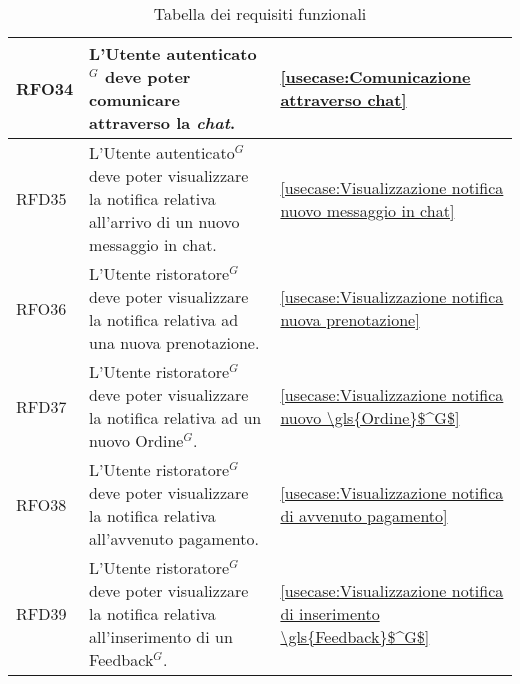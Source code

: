 \begin{table}[H]
\begin{tabularx}{\textwidth}{l|X|p{2cm}}
		\hline
		RFO34       & L'\gls{Utente autenticato}$^G$ deve poter comunicare attraverso la \textit{chat}.                                           & \autoref{usecase:Comunicazione attraverso chat}                                       \\
		\hline
		RFD35       & L'\gls{Utente autenticato}$^G$ deve poter visualizzare la notifica relativa all'arrivo di un nuovo messaggio in chat.       & \autoref{usecase:Visualizzazione notifica nuovo messaggio in chat}                    \\
		\hline
		RFO36       & L'\gls{Utente ristoratore}$^G$ deve poter visualizzare la notifica relativa ad una nuova prenotazione.                      & \autoref{usecase:Visualizzazione notifica nuova prenotazione}                               \\
		\hline
		RFD37       & L'\gls{Utente ristoratore}$^G$ deve poter visualizzare la notifica relativa ad un nuovo \gls{Ordine}$^G$.                             & \autoref{usecase:Visualizzazione notifica nuovo \gls{Ordine}$^G$}                               \\
		\hline
		RFO38       & L'\gls{Utente ristoratore}$^G$ deve poter visualizzare la notifica relativa all'avvenuto pagamento.                         & \autoref{usecase:Visualizzazione notifica di avvenuto pagamento}                      \\
		\hline
		RFD39       & L'\gls{Utente ristoratore}$^G$ deve poter visualizzare la notifica relativa all'inserimento di un \gls{Feedback}$^G$.                 & \autoref{usecase:Visualizzazione notifica di inserimento \gls{Feedback}$^G$}                    \\
	\end{tabularx}
	\caption{Tabella dei requisiti funzionali}
\end{table}


